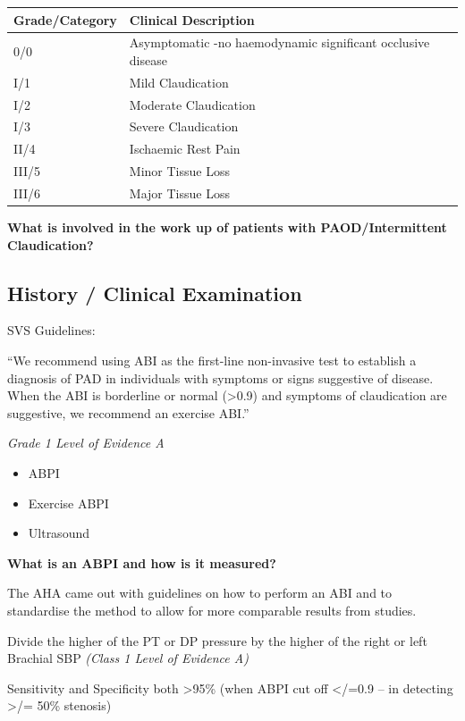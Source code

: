 \documentclass[
]{book}
\begin{document}
\begin{longtable}[]{@{}ll@{}}
\toprule
Grade/Category & Clinical Description \\
\midrule
\endhead
0/0 & Asymptomatic -no haemodynamic significant occlusive disease \\
I/1 & Mild Claudication \\
I/2 & Moderate Claudication \\
I/3 & Severe Claudication \\
II/4 & Ischaemic Rest Pain \\
III/5 & Minor Tissue Loss \\
III/6 & Major Tissue Loss \\
\bottomrule
\end{longtable}

\textbf{What is involved in the work up of patients with PAOD/Intermittent
Claudication?}

\hypertarget{history-clinical-examination}{%
\subsection{History / Clinical Examination}\label{history-clinical-examination}}

SVS Guidelines:

``We recommend using ABI as the first-line non-invasive test to establish
a diagnosis of PAD in individuals with symptoms or signs suggestive of
disease. When the ABI is borderline or normal (\textgreater0.9) and symptoms of
claudication are suggestive, we recommend an exercise ABI.''

\emph{Grade 1 Level of Evidence A}

\begin{itemize}
\item
  ABPI
\item
  Exercise ABPI
\item
  Ultrasound
\end{itemize}

\textbf{What is an ABPI and how is it measured?}

The AHA came out with guidelines on how to perform an ABI and to
standardise the method to allow for more comparable results from
studies.

Divide the higher of the PT or DP pressure by the higher of the right or
left Brachial SBP \emph{(Class 1 Level of Evidence A)}
\citep{aboyansMeasurementInterpretationAnkleBrachial2012}

Sensitivity and Specificity both \textgreater95\% (when ABPI cut off \textless/=0.9 -- in
detecting \textgreater/= 50\% stenosis) \citep{yaoAnkleSystolicPressure2005, ourielCriticalEvaluationStress1982}
\end{document}
